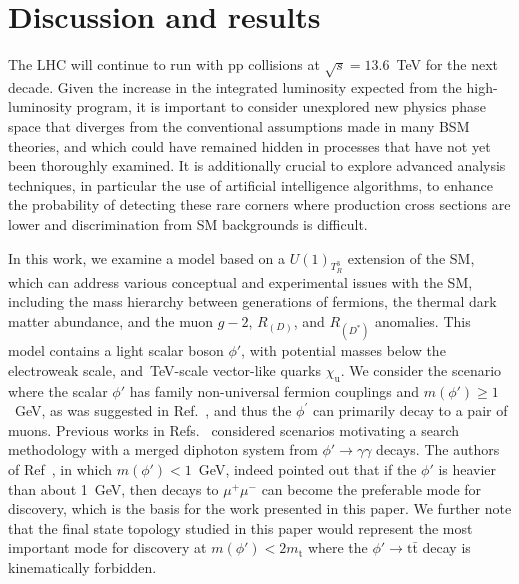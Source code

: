\chapter{Discussion and results}


The LHC will continue to run with pp collisions at $\sqrt{s} = 13.6$~\textrm{TeV} for the next decade. Given the increase in the integrated luminosity expected from the high-luminosity program, it is important to consider unexplored new physics phase space that diverges from the conventional assumptions made in many BSM theories, and which could have remained hidden in processes that have not yet been thoroughly examined. It is additionally crucial to explore advanced analysis techniques, in particular the use of artificial intelligence algorithms, to enhance the probability of detecting these rare corners where production cross sections are lower and discrimination from SM backgrounds is difficult. 

In this work, we examine a model based on a $U(1)_{T^3_R}$ extension of the SM, which can address various conceptual and experimental issues with the SM, including the mass hierarchy between generations of fermions, the thermal dark matter abundance, and the muon $g - 2$, $R_{(D)}$, and $R_{(D^*)}$ anomalies. This model contains a light scalar boson $\phi'$, with potential masses below the electroweak scale, and~\textrm{TeV}-scale vector-like quarks $\chi_\mathrm{u}$. We consider the scenario where the scalar $\phi'$ has family non-universal fermion couplings and $m(\phi') \ge 1$~\textrm{GeV}, as was suggested in Ref.~\parencite{Dutta2020}, and thus the $\phi^{\prime}$ can primarily decay to a pair of muons. Previous works in Refs.~\parencite{Dutta2023, Banerjee_2016} considered scenarios motivating a search methodology with a merged diphoton system from $\phi' \to \gamma\gamma$ decays. The authors of Ref~\parencite{Dutta2023}, in which $m(\phi') < 1$~\textrm{GeV},  indeed pointed out that if the $\phi'$ is heavier than about 1~\textrm{GeV}, then decays to $\mu^+ \mu^-$ can become the preferable mode for discovery, which is the basis for the work presented in this paper. We further note that the final state topology studied in this paper would represent the most important mode for discovery at $m(\phi') < 2 m_{\mathrm{t}}$ where the $\phi' \to \mathrm{t\bar{t}}$ decay is kinematically forbidden. 

